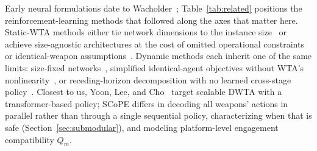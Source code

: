 Early neural formulations date to Wacholder~\cite{wacholder1989neural}; Table~\ref{tab:related} positions the reinforcement-learning methods that followed along the axes that matter here. Static-WTA methods either tie network dimensions to the instance size~\cite{meng2021deep,shin2020mean,gaudet2023} or achieve size-agnostic architectures at the cost of omitted operational constraints or identical-weapon assumptions~\cite{luo2021learning,na2023weapon,vinyals2015pointer}. Dynamic methods each inherit one of the same limits: size-fixed networks~\cite{wu2022dynamic}, simplified identical-agent objectives without WTA's nonlinearity~\cite{hu2024}, or receding-horizon decomposition with no learned cross-stage policy~\cite{zhang2020efficient,zhang2020dynamic}. Closest to us, Yoon, Lee, and Cho~\cite{yoontransformer} target scalable DWTA with a transformer-based policy; SCoPE differs in decoding all weapons' actions in parallel rather than through a single sequential policy, characterizing when that is safe (Section~\ref{sec:submodular}), and modeling platform-level engagement compatibility $Q_m$.

